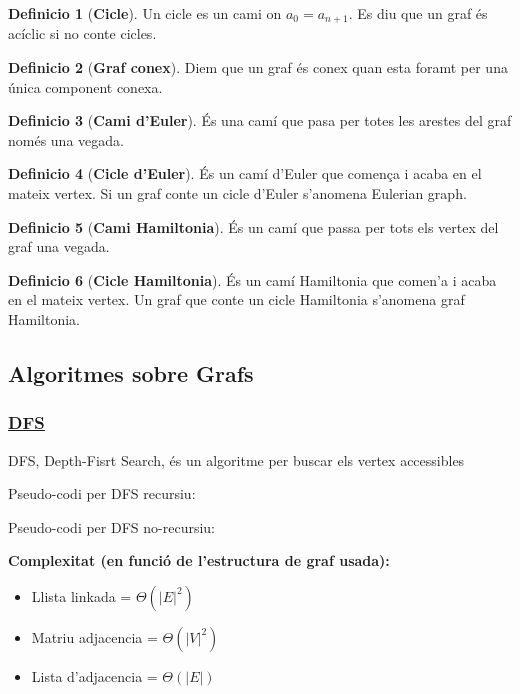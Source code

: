 \documentclass[12pt]{article}
\theoremstyle{definition}
\newtheorem{definicio}{Definicio}
\theoremstyle{definition}
\theoremstyle{definition}
\theoremstyle{definition}
\theoremstyle{definition}
\theoremstyle{definition}
\theoremstyle{definition}
\begin{document}
\begin{definicio}[\textbf{Cicle}]
Un cicle es un cami on $a_0=a_{n+1}$. Es diu que un graf és acíclic si no conte cicles.
\end{definicio}

\begin{definicio}[\textbf{Graf conex}]
Diem que un graf és conex quan esta foramt per una única component conexa.
\end{definicio}

\begin{definicio}[\textbf{Cami d'Euler}]
És una camí que pasa per totes les arestes del graf només una vegada.
\end{definicio}

\begin{definicio}[\textbf{Cicle d'Euler}]
És un camí d'Euler que comença i acaba en el mateix vertex. Si un graf conte un cicle d'Euler s'anomena Eulerian graph.
\end{definicio}

\begin{definicio}[\textbf{Cami Hamiltonia}]
És un camí que passa per tots els vertex del graf una vegada.
\end{definicio}

\begin{definicio}[\textbf{Cicle Hamiltonia}]
És un camí Hamiltonia que comen'a i acaba en el mateix vertex. Un graf que conte un cicle Hamiltonia s'anomena graf Hamiltonia.
\end{definicio}

\subsection{Algoritmes sobre Grafs}

\subsubsection{\href{https://en.wikipedia.org/wiki/Depth-first_search}{\color{blue}\underline{DFS}}}
DFS, Depth-Fisrt Search, és un algoritme per buscar els vertex accessibles

Pseudo-codi per DFS recursiu:


\newpage

Pseudo-codi per DFS no-recursiu:


\textbf{Complexitat (en funció de l'estructura de graf usada):}
\begin{itemize}
	\item Llista linkada = $\Theta(|E|^2)$
	\item Matriu adjacencia = $\Theta(|V|^2)$
	\item Lista d'adjacencia = $\Theta(|E|)$
\end{itemize}
\end{document}
